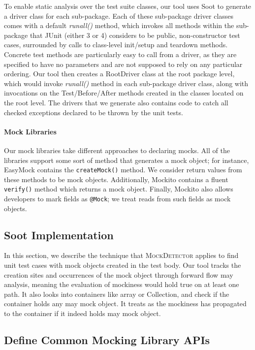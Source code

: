 To enable static analysis over the test suite classes, our tool uses Soot to generate a driver class for each sub-package. Each of these sub-package driver classes comes with a default \textit{runall()} method, which invokes all methods within the sub-package that JUnit (either 3 or 4) considers to be public, non-constructor test cases, surrounded by calls to class-level init/setup and teardown methods. Concrete test methods are particularly easy to call from a driver, as they are specified to have no parameters and are not supposed to rely on any particular ordering. 
Our tool then creates a RootDriver class at the root package level, which would invoke \textit{runall()} method in each sub-package driver class, along with invocations on the Test/Before/After methods created in the classes located on the root level. The drivers that we generate also contains code to catch all checked exceptions declared to be thrown by the unit tests.

\paragraph{Mock Libraries}
Our mock libraries take different approaches to declaring mocks. All of the libraries support some sort of method that generates a mock object; for instance, EasyMock contains the \texttt{createMock()} method. We consider return values from these methods to be mock objects. Additionally, Mockito contains a fluent \texttt{verify()} method which returns a mock object. Finally, Mockito also allows developers to mark fields as \texttt{@Mock}; we treat reads from such fields as mock objects.

\subsection{Soot Implementation}
In this section, we describe the technique that \textsc{MockDetector} applies to find unit test cases with mock objects created in the test body. Our tool tracks the creation sites and occurrences of the mock object through forward flow may analysis, meaning the evaluation of mockiness would hold true on at least one path. It also looks into containers like array or Collection, and check if the container holds any may mock object. It treats as the mockiness has propagated to the container if it indeed holds may mock object.

\subsection{Define Common Mocking Library APIs}
\label{subsec:collection}

